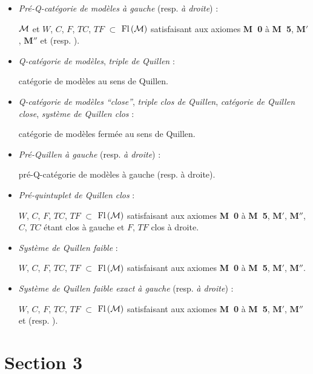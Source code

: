 \begin{itemize}
\item[\textbullet] \textit{Pré-Q-catégorie de modèles à gauche} (resp. \textit{à droite}) :

$\mathcal{M}$ et $W$, $C$, $F$, $TC$, $TF$ $\subset$ $\mathrm{Fl}\,(\mathcal{M})$ satisfaisant aux axiomes \textbf{M~0} à \textbf{M~5}, $\mathbf{M}'$, $\mathbf{M}''$ et \Mzg{} (resp. \Mzd).

\item[\textbullet] \textit{Q-catégorie de modèles}, \textit{triple de Quillen} :

catégorie de modèles au sens de Quillen.

\item[\textbullet] \textit{Q-catégorie de modèles “close”}, \textit{triple clos de Quillen}, \textit{catégorie de Quillen close}, \textit{système de Quillen clos} :

catégorie de modèles fermée au sens de Quillen.

\item[\textbullet] \textit{Pré-Quillen à gauche} (resp. \textit{à droite}) :

pré-Q-catégorie de modèles à gauche (resp. à droite).

\item[\textbullet] \textit{Pré-quintuplet de Quillen clos} :

$W$, $C$, $F$, $TC$, $TF$ $\subset$ $\mathrm{Fl}\,(\mathcal{M})$ satisfaisant aux axiomes \textbf{M~0} à \textbf{M~5}, $\mathbf{M}'$, $\mathbf{M}''$, $C$, $TC$ étant clos à gauche et $F$, $TF$ clos à droite.

\item[\textbullet] \textit{Système de Quillen faible} :

$W$, $C$, $F$, $TC$, $TF$ $\subset$ $\mathrm{Fl}\,(\mathcal{M})$ satisfaisant aux axiomes \textbf{M~0} à \textbf{M~5}, $\mathbf{M}'$, $\mathbf{M}''$.

\item[\textbullet] \textit{Système de Quillen faible exact à gauche} (resp. \textit{à droite}) :

$W$, $C$, $F$, $TC$, $TF$ $\subset$ $\mathrm{Fl}\,(\mathcal{M})$ satisfaisant aux axiomes \textbf{M~0} à \textbf{M~5}, $\mathbf{M}'$, $\mathbf{M}''$ et \Mzg{} (resp. \Mzd).
\end{itemize}

\section*{Section 3}

